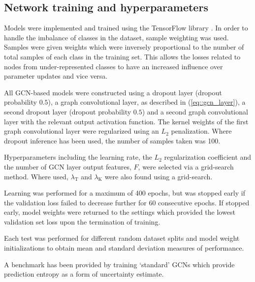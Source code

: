 \documentclass[
twocolumn,
]{ceurart}
\begin{document}
\subsection{Network training and hyperparameters}
Models were implemented and trained using the TensorFlow library \cite{Abadi2015}.
In order to handle the imbalance of classes in the dataset, sample weighting was used.
Samples were given weights which were inversely proportional to the number of total samples of each class in the training set.
This allows the losses related to nodes from under-represented classes to have an increased influence over parameter updates and vice versa.

All GCN-based models were constructed using a dropout layer (dropout probability $0.5$), a graph convolutional layer, as described in (\ref{eq::gcn_layer}), a second dropout layer (dropout probability $0.5$) and a second graph convolutional layer with the relevant output activation function.
The kernel weights of the first graph convolutional layer were regularized using an $L_2$ penalization.
Where dropout inference has been used, the number of samples taken was 100.

Hyperparameters including the learning rate, the $L_2$ regularization coefficient and the number of GCN layer output features, $F$, were selected via a grid-search method.
Where used, $\lambda_{\text{T}}$ and $\lambda_{\text{K}}$ were also found using a grid-search.

Learning was performed for a maximum of 400 epochs, but was stopped early if the validation loss failed to decrease further for 60 consecutive epochs.
If stopped early, model weights were returned to the settings which provided the lowest validation set loss upon the termination of training.

Each test was performed for different random dataset splits and model weight initializations to obtain mean and standard deviation measures of performance.

A benchmark has been provided by training `standard' GCNs which provide prediction entropy as a form of uncertainty estimate.
\end{document}
